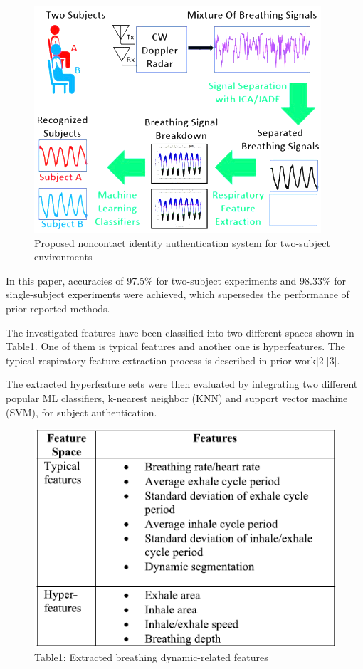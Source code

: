 \documentclass[dvipdfmx]{article}
\begin{document}
\begin{figure}[H]
\begin{center}
\includegraphics[width=0.85\linewidth]{./img/system_respiration.png}
\end{center}
\caption{Proposed noncontact identity authentication system for two-subject environments}
\end{figure}

In this paper, accuracies of 97.5\% for two-subject experiments and 98.33\% for single-subject experiments were achieved, which supersedes the performance of prior reported methods.

The investigated
features have been classified into two different spaces shown
in Table1. One of them is typical features and another one
is hyperfeatures. The typical respiratory feature extraction
process is described in prior work[2][3].

The extracted hyperfeature sets were then evaluated by integrating two different popular ML classifiers, k-nearest neighbor (KNN) and support vector machine (SVM), for subject authentication.

\begin{figure}[H]
\caption*{Table1: Extracted breathing dynamic-related features}
\begin{center}
\includegraphics[width=0.8\linewidth]{./img/features_respiration.png}
\end{center}
\end{figure}
\end{document}

